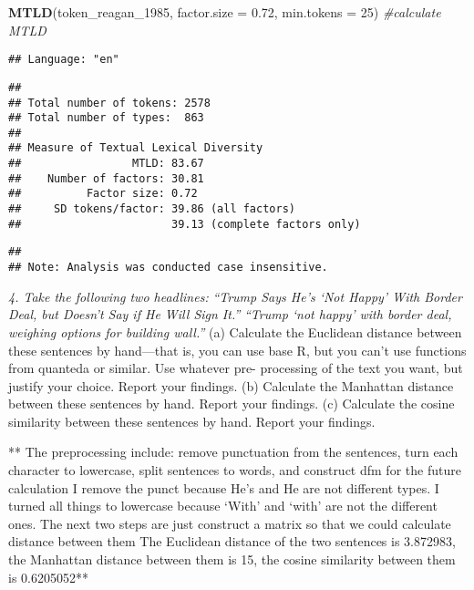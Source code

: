 \documentclass[]{article}
\newenvironment{Shaded}{\begin{snugshade}}{\end{snugshade}}
\newcommand{\KeywordTok}[1]{\textcolor[rgb]{0.13,0.29,0.53}{\textbf{#1}}}
\newcommand{\DataTypeTok}[1]{\textcolor[rgb]{0.13,0.29,0.53}{#1}}
\newcommand{\DecValTok}[1]{\textcolor[rgb]{0.00,0.00,0.81}{#1}}
\newcommand{\FloatTok}[1]{\textcolor[rgb]{0.00,0.00,0.81}{#1}}
\newcommand{\CommentTok}[1]{\textcolor[rgb]{0.56,0.35,0.01}{\textit{#1}}}
\newcommand{\NormalTok}[1]{#1}
\begin{document}
\begin{Shaded}
\begin{Highlighting}[]
\KeywordTok{MTLD}\NormalTok{(token_reagan_}\DecValTok{1985}\NormalTok{, }\DataTypeTok{factor.size =} \FloatTok{0.72}\NormalTok{, }\DataTypeTok{min.tokens =} \DecValTok{25}\NormalTok{) }\CommentTok{#calculate MTLD}
\end{Highlighting}
\end{Shaded}

\begin{verbatim}
## Language: "en"
\end{verbatim}

\begin{verbatim}
## 
## Total number of tokens: 2578
## Total number of types:  863
## 
## Measure of Textual Lexical Diversity
##                 MTLD: 83.67
##    Number of factors: 30.81
##          Factor size: 0.72
##     SD tokens/factor: 39.86 (all factors)
##                       39.13 (complete factors only)
\end{verbatim}

\begin{verbatim}
## 
## Note: Analysis was conducted case insensitive.
\end{verbatim}

\emph{4. Take the following two headlines:} \emph{``Trump Says He's `Not
Happy' With Border Deal, but Doesn't Say if He Will Sign It.''}
\emph{``Trump `not happy' with border deal, weighing options for
building wall.''} (a) Calculate the Euclidean distance between these
sentences by hand---that is, you can use base R, but you can't use
functions from quanteda or similar. Use whatever pre- processing of the
text you want, but justify your choice. Report your findings. (b)
Calculate the Manhattan distance between these sentences by hand. Report
your findings. (c) Calculate the cosine similarity between these
sentences by hand. Report your findings.

** The preprocessing include: remove punctuation from the sentences,
turn each character to lowercase, split sentences to words, and
construct dfm for the future calculation\textbf{ }I remove the punct
because He's and He are not different types. I turned all things to
lowercase because `With' and `with' are not the different ones. The next
two steps are just construct a matrix so that we could calculate
distance between them \textbf{ }The Euclidean distance of the two
sentences is 3.872983, the Manhattan distance between them is 15, the
cosine similarity between them is 0.6205052**
\end{document}
